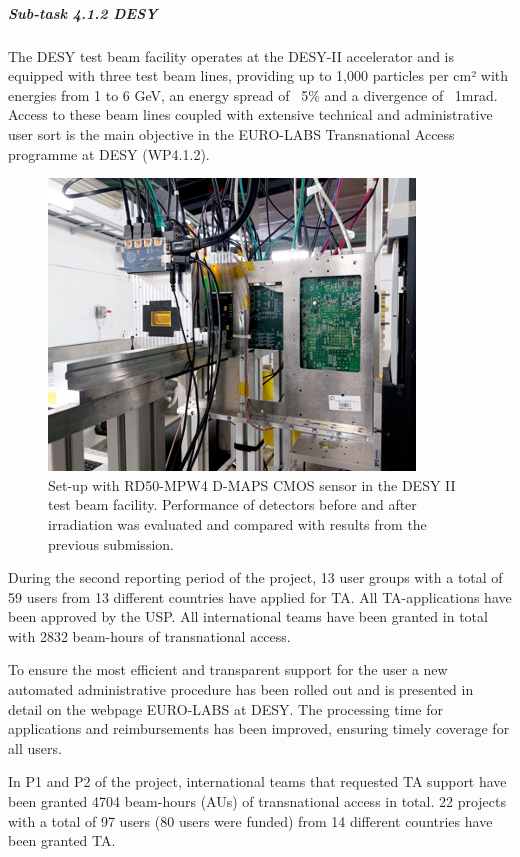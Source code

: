\subparagraph{Sub-task 4.1.2 DESY} \mbox{}

The DESY test beam facility operates at the DESY-II accelerator and is equipped with three test beam lines, providing up to 1,000 particles per cm² with energies from 1 to 6 GeV, an energy spread of ~5\% and a divergence of ~1mrad. Access to these beam lines coupled with extensive technical and administrative user sort is the main objective in the EURO-LABS Transnational Access programme at DESY (WP4.1.2). 

\begin{figure}[!h]
    \centering
    \includegraphics[width=0.75\linewidth]{image2.png}
    \caption{Set-up with RD50-MPW4 D-MAPS CMOS sensor in the DESY II test beam facility. Performance of detectors before and after irradiation was evaluated and compared with results from the previous submission.}
    \label{fig:4.1.2}
\end{figure}

During the second reporting period of the project, 13 user groups with a total of 59 users from 13 different countries have applied for TA. All TA-applications have been approved by the USP. All international teams have been granted in total with 2832 beam-hours of transnational access. 

To ensure the most efficient and transparent support for the user a new automated administrative procedure has been rolled out and is presented in detail on the webpage EURO-LABS at DESY. The processing time for applications and reimbursements has been improved, ensuring timely coverage for all users.

In P1 and P2 of the project, international teams that requested TA support have been granted 4704 beam-hours (AUs) of transnational access in total. 22 projects with a total of 97 users (80 users were funded) from 14 different countries have been granted TA.

